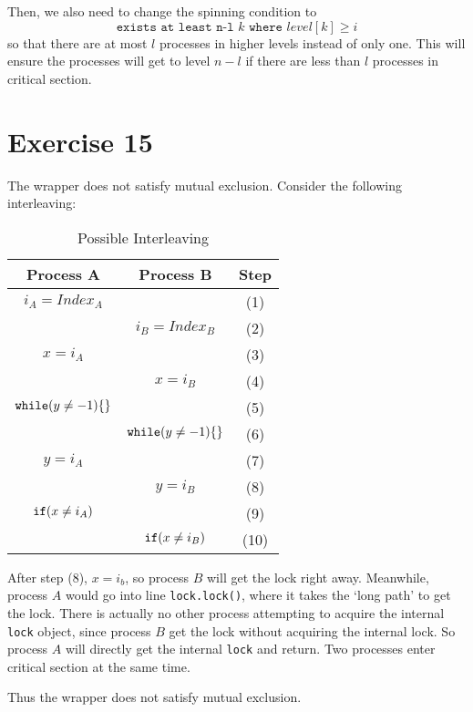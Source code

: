 \documentclass{article}
\begin{document}
Then, we also need to change the spinning condition to
\[\texttt{exists at least n-l } k \texttt{ where } level[k] \geq i\]
so that there are at most $l$ processes in higher levels instead of only one.
This will ensure the processes will get to level $n-l$ if there are less than
$l$ processes in critical section.

\section{Exercise 15}
The wrapper does not satisfy mutual exclusion. Consider the following
interleaving:
\begin{table}[H]
\centering
\caption{Possible Interleaving}\label{int}
\begin{tabular}{ccc}
    \toprule
    Process A & Process B & Step \\\midrule
    $i_A = Index_A$      & & (1) \\
                         & $i_B = Index_B$ & (2) \\
    $x = i_A$            & & (3)\\
                         & $x = i_B$ & (4)\\
    $\verb|while|(y \neq -1)\{\}$   & & (5)\\
                             & $\verb|while|(y \neq -1)\{\}$ & (6)\\
    $y = i_A$ & & (7) \\
              & $y = i_B$ & (8) \\
    $\verb|if| (x \neq i_A)$  &  & (9) \\
                              & $\verb|if| (x \neq i_B)$ & (10) \\
    \bottomrule
\end{tabular}
\end{table}

After step (8), $x = i_b$, so process $B$ will get the lock right away.
Meanwhile, process $A$ would go into line \verb|lock.lock()|, where it takes
the `long path' to get the lock. There is actually no other process attempting
to acquire the internal \verb|lock| object, since process $B$ get the lock
without acquiring the internal lock. So process $A$ will directly get the
internal \verb|lock| and return. Two processes enter critical section at the
same time.

Thus the wrapper does not satisfy mutual exclusion.
\end{document}
